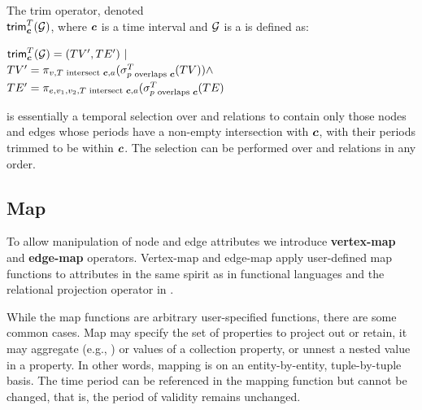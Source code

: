 \begin{definition}[Trim]
\label{def:slice}
The trim operator, denoted \\$\textsf{trim}^T_{\boldsymbol{c}}(\mathcal{G})$, where
$\boldsymbol{c}$ is a time interval and $\mathcal{G}$ is a \tg is defined as:

$\textsf{trim}^T_{\boldsymbol{c}}(\mathcal{G}) = (TV', TE') ~|~$\\ $TV' = \pi_{v,T \text{ intersect } \boldsymbol{c},a}(\sigma^T_{p \text{ overlaps } \boldsymbol{c}}(TV)) \land$ \\ $TE' = \pi_{e,v_1,v_2,T \text{ intersect } \boldsymbol{c},a}(\sigma^T_{p \text{ overlaps } \boldsymbol{c}}(TE)$
\end{definition}

 is essentially a temporal selection over \tv and \te
relations to contain only those nodes and edges whose periods have a
non-empty intersection with $\boldsymbol{c}$, with their periods trimmed to be
within $\boldsymbol{c}$.  The selection can be performed over \tv and \te
relations in any order.

\subsection{Map}

To allow manipulation of node and edge attributes we
introduce {\bf vertex-map} and {\bf edge-map} operators.  Vertex-map
and edge-map apply user-defined map functions to attributes in the
same spirit as  in functional languages and the relational
projection operator in \tra.

While the map functions are arbitrary user-specified functions, there
are some common cases.  Map may specify the set of properties to
project out or retain, it may aggregate (e.g., ) or
values of a collection property, or unnest a nested value in a
property.  In other words, mapping is on an entity-by-entity,
tuple-by-tuple basis.  The time period can be referenced in the
mapping function but cannot be changed, that is, the period of
validity remains unchanged.

